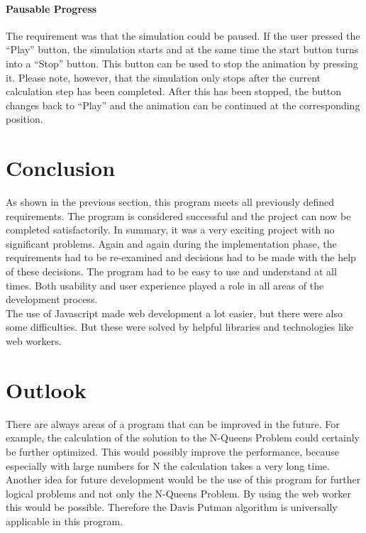\paragraph{Pausable Progress}
The requirement was that the simulation could be paused. If the user pressed the \enquote{Play} button, the simulation starts and at the same time the start button turns into a \enquote{Stop} button. This button can be used to stop the animation by pressing it. Please note, however, that the simulation only stops after the current calculation step has been completed. After this has been stopped, the button changes back to \enquote{Play} and the animation can be continued at the corresponding position.
\section{Conclusion}
As shown in the previous section, this program meets all previously defined requirements. The program is considered successful and the project can now be completed satisfactorily. In summary, it was a very exciting project with no significant problems. Again and again during the implementation phase, the requirements had to be re-examined and decisions had to be made with the help of these decisions. The program had to be easy to use and understand at all times. Both usability and user experience played a role in all areas of the development process. 
\\
The use of Javascript made web development a lot easier, but there were also some difficulties. But these were solved by helpful libraries and technologies like web workers. 
\section{Outlook} 
There are always areas of a program that can be improved in the future. For example, the calculation of the solution to the N-Queens Problem could certainly be further optimized. This would possibly improve the performance, because especially with large numbers for N the calculation takes a very long time. 
\\
Another idea for future development would be the use of this program for further logical problems and not only the N-Queens Problem. By using the web worker this would be possible. Therefore the Davis Putman algorithm is universally applicable in this program.

